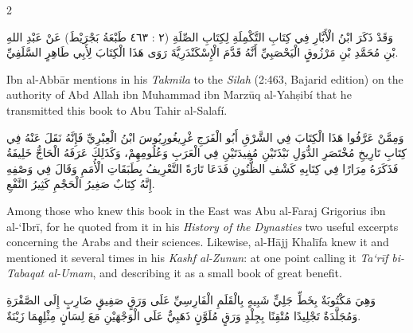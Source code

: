 \documentclass[11pt,a4paper]{article}
\begin{document}
\begin{paracol}{2}
\switchcolumn

\begin{leftcolumn}
\vspace{0.2cm}
{\arabicfont\beginR
وَقَدْ ذَكَرَ ابْنُ الْأَبَّارِ فِي كِتَابِ التَّكْمِلَةِ لِكِتَابِ الصِّلَةِ (٢ : ٤٦٣ طَبْعَةُ بَجْرَيْطَ) عَنْ عَبْدِ اللهِ بْنِ مُحَمَّدِ بْنِ مَرْزُوقٍ الْيَحْصَبِيِّ أَنَّهُ قَدَّمَ الْإِسْكَنْدَرِيَّةَ رَوَى هَذَا الْكِتَابَ لِأَبِي طَاهِرٍ السَّلَفِيِّ.
\endR}
\end{leftcolumn}

\begin{rightcolumn}
\vspace{0.2cm}
Ibn al-Abb\={a}r mentions in his \textit{Takmila} to the \textit{Silah} (2:463, Bajarid edition) on the authority of Abd Allah ibn Muhammad ibn Marz\={u}q al-Yah\d{s}ib\'{i} that he transmitted this book to Abu Tahir al-Salaf\'{i}.
\end{rightcolumn}

\switchcolumn

\begin{leftcolumn}
\vspace{0.2cm}
{\arabicfont\beginR
وَمِمَّنْ عَرَّفُوا هَذَا الْكِتَابَ فِي الشَّرْقِ أَبُو الْفَرَجِ غْرِيغُورِيُوسَ ابْنُ الْعِبْرِيِّ فَإِنَّهُ نَقَلَ عَنْهُ فِي كِتَابِ تَارِيخِ مُخْتَصَرِ الدُّوَلِ نَبْذَتَيْنِ مُفِيدَتَيْنِ فِي الْعَرَبِ وَعُلُومِهِمْ، وَكَذَلِكَ عَرَفَهُ الْحَاجُّ خَلِيفَةُ فَذَكَرَهُ مِرَارًا فِي كِتَابِهِ كَشْفِ الظُّنُونِ فَدَعَا تَارَةً التَّعْرِيفُ بِطَبَقَاتِ الْأُمَمِ وَقَالَ فِي وَصْفِهِ إِنَّهُ كِتَابٌ صَغِيرُ الْحَجْمِ كَثِيرُ النَّفْعِ.
\endR}
\end{leftcolumn}

\begin{rightcolumn}
\vspace{0.2cm}
Among those who knew this book in the East was Abu al-Faraj Grigorius ibn al-\textquoteleft Ibr\={i}, for he quoted from it in his \textit{History of the Dynasties} two useful excerpts concerning the Arabs and their sciences. Likewise, al-H\={a}jj Khal\={i}fa knew it and mentioned it several times in his \textit{Kashf al-Zunun}: at one point calling it \textit{Ta\textquoteleft r\={i}f bi-Tabaqat al-Umam}, and describing it as a small book of great benefit.
\end{rightcolumn}

\switchcolumn

\begin{leftcolumn}
\vspace{0.2cm}
{\arabicfont\beginR
وَهِيَ مَكْتُوبَةٌ بِخَطِّ جَلِيٍّ شَبِيهٍ بِالْقَلَمِ الْفَارِسِيِّ عَلَى وَرَقٍ صَفِيقٍ ضَارِبٍ إِلَى الصَّفْرَةِ وَمُجَلَّدَةٌ تَجْلِيدًا مُتْقِنًا بِجِلْدٍ وَرَقٍ مُلَوَّنٍ ذَهَبِيٌّ عَلَى الْوَجْهَيْنِ مَعَ لِسَانٍ مِثْلِهِمَا زَيْنَةٌ.
\endR}
\end{leftcolumn}


\end{paracol}
\end{document}
